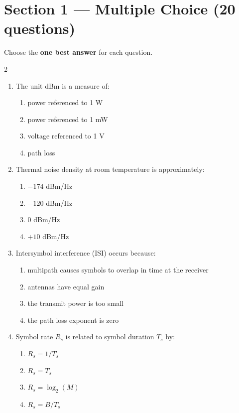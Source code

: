 \section*{Section 1 --- Multiple Choice (20 questions)}
Choose the \textbf{one best answer} for each question.

\vspace{0.3cm}
\begin{multicols}{2}
\begin{enumerate}[leftmargin=*, itemsep=0.4em]
\item The unit dBm is a measure of:
\begin{enumerate}[label=\alph*)]
\item power referenced to 1 W
\item power referenced to 1 mW
\item voltage referenced to 1 V
\item path loss
\end{enumerate}

\item Thermal noise density at room temperature is approximately:
\begin{enumerate}[label=\alph*)]
\item $-174$ dBm/Hz
\item $-120$ dBm/Hz
\item $0$ dBm/Hz
\item $+10$ dBm/Hz
\end{enumerate}

\item Intersymbol interference (ISI) occurs because:
\begin{enumerate}[label=\alph*)]
\item multipath causes symbols to overlap in time at the receiver
\item antennas have equal gain
\item the transmit power is too small
\item the path loss exponent is zero
\end{enumerate}

\item Symbol rate $R_s$ is related to symbol duration $T_s$ by:
\begin{enumerate}[label=\alph*)]
\item $R_s = 1/T_s$
\item $R_s = T_s$
\item $R_s = \log_2(M)$
\item $R_s = B/T_s$
\end{enumerate}


\end{enumerate}
\end{multicols}
